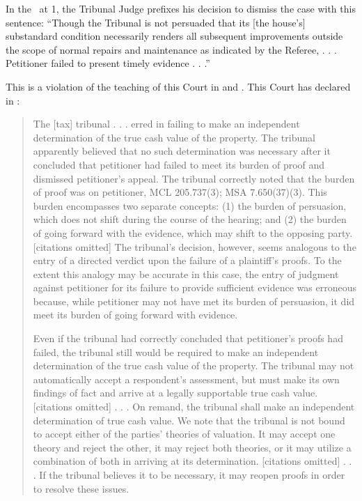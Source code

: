 \documentclass[12pt,\documentclassflag]{michiganCourtOfAppealsBrief}
\begin{document}
{In the \FOJ\ at 1, the Tribunal Judge prefixes his decision to dismiss the case with this sentence: ``Though the Tribunal is not persuaded that its [the house's] substandard condition necessarily renders all subsequent improvements outside the scope of normal repairs and maintenance as indicated by the Referee, . . . Petitioner failed to present timely evidence . . .''

This is a violation of the teaching of this Court in \cite{Jones & Laughlin} and \cite{Fisher}. This Court has declared in :

\begin{quote}
The [tax] tribunal . . . erred in failing to make an independent determination of the true cash value of the property. The tribunal apparently believed that no such determination was necessary after it concluded that petitioner had failed to meet its burden of proof and dismissed petitioner's appeal. The tribunal correctly noted that the burden of proof was on petitioner, MCL 205.737(3); MSA 7.650(37)(3). This burden encompasses two separate concepts: (1) the burden of persuasion, which does not shift during the course of the hearing; and (2) the burden of going forward with the evidence, which may shift to the opposing party. [citations omitted] The tribunal's decision, however, seems analogous to the entry of a directed verdict upon the failure of a plaintiff's proofs. To the extent this analogy may be accurate in this case, the entry of judgment against petitioner for its failure to provide sufficient evidence was erroneous because, while petitioner may not have met its burden of persuasion, it did meet its burden of going forward with evidence.

  Even if the tribunal had correctly concluded that petitioner's proofs had failed, the tribunal still would be required to make an independent determination of the true cash value of the property. The tribunal may not automatically accept a respondent's assessment, but must make its own findings of fact and arrive at a legally supportable true cash value. [citations omitted] . . . On remand, the tribunal shall make an independent determination of true cash value. We note that the tribunal is not bound to accept either of the parties' theories of valuation. It may accept one theory and reject the other, it may reject both theories, or it may utilize a combination of both in arriving at its determination. [citations omitted] . . . If the tribunal believes it to be necessary, it may reopen proofs in order to resolve these issues.
\end{quote}

}
\end{document}
